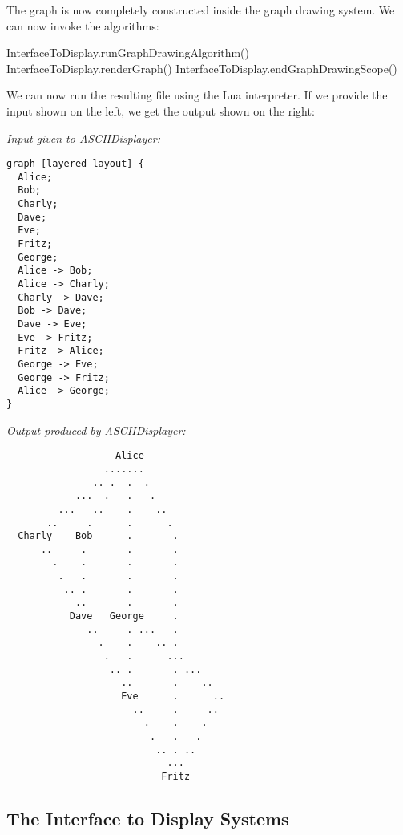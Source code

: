 The graph is now completely constructed inside the graph drawing
system. We can now invoke the algorithms:

\begin{codeexample}
InterfaceToDisplay.runGraphDrawingAlgorithm()
InterfaceToDisplay.renderGraph()
InterfaceToDisplay.endGraphDrawingScope()
\end{codeexample}

We can now run the resulting file using the Lua interpreter. If we
provide the input shown on the left, we get the output shown on the
right:

\bigskip
\noindent
\begin{minipage}[t]{.5\textwidth}
\emph{Input given to ASCIIDisplayer:}  
  
\begin{verbatim}
graph [layered layout] {
  Alice;
  Bob;
  Charly;
  Dave;
  Eve;
  Fritz;
  George;
  Alice -> Bob;
  Alice -> Charly;
  Charly -> Dave;
  Bob -> Dave;
  Dave -> Eve;
  Eve -> Fritz;
  Fritz -> Alice;
  George -> Eve;
  George -> Fritz;
  Alice -> George;
}  
\end{verbatim}
\end{minipage}%
\begin{minipage}[t]{.49\textwidth}
\emph{Output produced by ASCIIDisplayer:}  
  
\begin{verbatim}
                   Alice                            
                 .......                            
               .. .  .  .                           
            ...  .   .   .                          
         ...   ..    .    ..                        
       ..     .      .      .                       
  Charly    Bob      .       .                      
      ..     .       .       .                      
        .    .       .       .                      
         .   .       .       .                      
          .. .       .       .                      
            ..       .       .                      
           Dave   George     .                      
              ..     . ...   .                      
                .    .    .. .                      
                 .   .      ...                     
                  .. .       . ...                  
                    ..       .    ..                
                    Eve      .      ..              
                      ..     .     ..               
                        .    .    .                 
                         .   .   .                  
                          .. . ..                   
                            ...                     
                           Fritz                    
\end{verbatim}
\end{minipage}


\subsection{The Interface to Display Systems}


